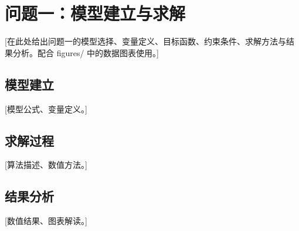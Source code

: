 \section{问题一：模型建立与求解}

[在此处给出问题一的模型选择、变量定义、目标函数、约束条件、求解方法与结果分析。配合 figures/ 中的数据图表使用。]

\subsection{模型建立}

[模型公式、变量定义。]

\subsection{求解过程}

[算法描述、数值方法。]

\subsection{结果分析}

[数值结果、图表解读。]
